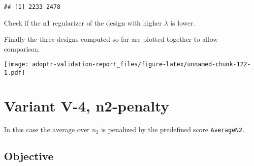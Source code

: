 \documentclass[]{book}
\newenvironment{Shaded}{\begin{snugshade}}{\end{snugshade}}
\newcommand{\DecValTok}[1]{\textcolor[rgb]{0.00,0.00,0.81}{#1}}
\newcommand{\KeywordTok}[1]{\textcolor[rgb]{0.13,0.29,0.53}{\textbf{#1}}}
\newcommand{\NormalTok}[1]{#1}
\newcommand{\OperatorTok}[1]{\textcolor[rgb]{0.81,0.36,0.00}{\textbf{#1}}}
\newcommand{\StringTok}[1]{\textcolor[rgb]{0.31,0.60,0.02}{#1}}
\begin{document}
\begin{verbatim}
## [1] 2233 2478
\end{verbatim}

\begin{Shaded}
\end{Shaded}

Check if the n1 regularizer of the design with higher \(\lambda\) is lower.

\begin{Shaded}
\end{Shaded}

Finally the three designs computed so far are plotted together to allow
comparison.

\texttt{[image: adoptr-validation-report\_files/figure-latex/unnamed-chunk-122-1.pdf]}

\hypertarget{variantV_4}{%
\section{Variant V-4, n2-penalty}\label{variantV_4}}

In this case the average over \(n_2\) is penalized by the predefined score
\texttt{AverageN2}.

\hypertarget{objective-13}{%
\subsection{Objective}\label{objective-13}}
\end{document}
